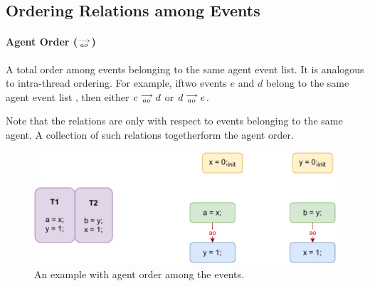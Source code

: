\subsection{Ordering Relations among Events}
        
    \paragraph{Agent Order ($\stackrel{\longrightarrow}{_{ao}}$)}
        A total order among events belonging to the same agent event list. It is analogous to intra-thread ordering. For example, iftwo events $e$ and $d$ belong to the same agent event list , then either $e\stackrel{\longrightarrow}{_{ao}}d$ or $d\stackrel{\longrightarrow}{_{ao}}e$. 
        
        Note that the relations are only with respect to events belonging to the same agent. A collection of such relations togetherform the agent order. 

        \begin{figure}[H]
            \centering
            \includegraphics[scale=0.7]{ECMAScriptMemoryModel/AgentOrder.pdf}
            \caption{An example with agent order among the events.}
        \end{figure}
